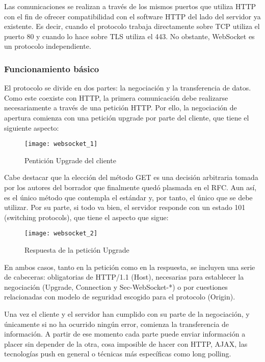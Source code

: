 Las comunicaciones se realizan a través de los mismos puertos que utiliza HTTP con el fin de ofrecer compatibilidad con el software HTTP del lado del servidor ya existente. Es decir, cuando el protocolo trabaja directamente sobre TCP utiliza el puerto 80 y cuando lo hace sobre TLS utiliza el 443. No obstante, WebSocket es un protocolo independiente.

\subsubsection{Funcionamiento básico}

El protocolo se divide en dos partes: la negociación y la transferencia de datos. Como este coexiste con HTTP, la primera comunicación debe realizarse necesariamente a través de una petición HTTP. Por ello, la negociación de apertura comienza con una petición upgrade por parte del cliente, que tiene el siguiente aspecto:

\begin{figure}[htp!]
  \centering
  \texttt{[image: websocket\_1]}
  \caption{Pentición Upgrade del cliente}
  \label{fig:websocket_1}
\end{figure}

Cabe destacar que la elección del método GET es una decisión arbitraria tomada por los autores del borrador que finalmente quedó plasmada en el RFC. Aun así, es el único método que contempla el estándar y, por tanto, el único que se debe utilizar. Por su parte, si todo va bien, el servidor responde con un estado 101 (switching protocols), que tiene el aspecto que sigue:

\begin{figure}[htp!]
  \centering
  \texttt{[image: websocket\_2]}
  \caption{Respuesta de la petición Upgrade}
  \label{fig:websocket_2}
\end{figure}

En ambos casos, tanto en la petición como en la respuesta, se incluyen una serie de cabeceras: obligatorias de HTTP/1.1 (Host), necesarias para establecer la negociación (Upgrade, Connection y Sec-WebSocket-*) o por cuestiones relacionadas con modelo de seguridad escogido para el protocolo (Origin).

Una vez el cliente y el servidor han cumplido con su parte de la negociación, y únicamente si no ha ocurrido ningún error, comienza la transferencia de información. A partir de ese momento cada parte puede enviar información a placer sin depender de la otra, cosa imposible de hacer con HTTP, AJAX, las tecnologías push en general o técnicas más específicas como long polling.

